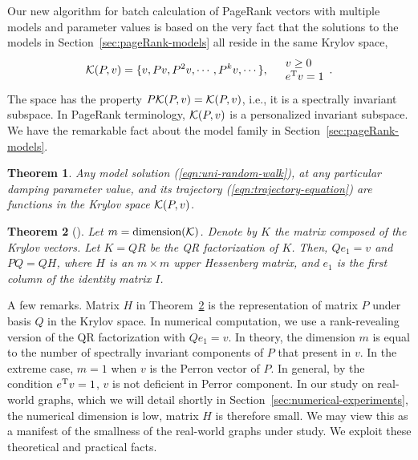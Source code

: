 \documentclass[conference]{IEEEtran}
\begin{document}
Our new algorithm for batch calculation of PageRank vectors with
multiple models and parameter values is based on the very fact that the
solutions to the models in Section~\ref{sec:pageRank-models} all reside
in the same Krylov space,
%
\begin{equation} 
\label{eqn:Krylov-space} 
{\cal K}(P, v) = \{v, Pv, P^2v, \cdots, P^{k}v, \cdots  \}, 
\quad 
\begin{array}{l} v\geq 0 \\ e^{\rm T}v = 1 \end{array}. 
\end{equation} 
%
The space has the property $P {\cal K}(P,v) = {\cal K}(P,v)$, i.e., it
is a spectrally invariant subspace. In PageRank terminology,
${\cal K}(P,v)$ is a personalized invariant subspace.  
%
We have the remarkable fact about the model family in Section~\ref{sec:pageRank-models}. 
%
\newtheorem{theorem}{Theorem}
\begin{theorem}
\label{thm:krylove-functions}
%
Any model solution (\ref{eqn:uni-random-walk}), at any particular
damping parameter value, and its
trajectory (\ref{eqn:trajectory-equation}) are functions in the Krylov
space ${\cal K}(P,v)$.
\end{theorem} 


\begin{theorem}[]
\label{thm:krylov}
Let $m=\mbox{dimension}({\cal K}) $.  Denote by $K$ the matrix
composed of the Krylov vectors.  Let $K = QR$ be the QR factorization of
$K$.  Then, $Qe_1 =v$ and $PQ = QH$, where $H$ is an $m\times m$ upper
Hessenberg matrix, and $e_1$ is the first column of the identity matrix $I$.
\end{theorem}
%

A few remarks. Matrix $H$ in Theorem~\ref{thm:krylov} is the
representation of matrix $P$ under basis $Q$ in the Krylov space.  In
numerical computation, we use a rank-revealing version of the QR
factorization with $Qe_1 = v$.
%
In theory, the dimension $m$ is equal to the number of spectrally
invariant components of $P$ that present in $v$.  In the extreme case,
$m=1$ when $v$ is the Perron vector of $P$. In general, by the condition
$e^{\rm T}v =1$, $v$ is not deficient in Perror component. In our study
on real-world graphs, which we will detail shortly in Section~\ref{sec:numerical-experiments},
the numerical dimension is low, matrix $H$ is therefore small.  We may
view this as a manifest of the smallness of the real-world graphs under
study.  We exploit these theoretical and practical facts.
\end{document}
